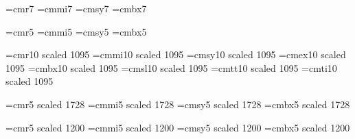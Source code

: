 {\font\sevenrm=cmr7 \font\seveni=cmmi7
\font\sevensy=cmsy7 \font\sevenbf=cmbx7

\font\fiverm=cmr5 \font\fivei=cmmi5
\font\fivesy=cmsy5 \font\fivebf=cmbx5

\def\tenpoint{\normalbaselineskip=12pt plus 0.1pt minus 0.1pt%
\abovedisplayskip 12pt plus 3pt minus 9pt%
\belowdisplayskip 12pt plus 3pt minus 9pt%
\abovedisplayshortskip 0pt plus 3pt%
\belowdisplayshortskip 7pt plus 3pt minus 4pt%
\smallskipamount=3pt plus1pt minus1pt%
\medskipamount=6pt plus2pt minus2pt%
\bigskipamount=12pt plus4pt minus4pt%
\def\rm{\fam0\tenrm}\def\it{\fam\itfam\tenit}%
\def\sl{\fam\slfam\tensl}\def\bf{\fam\bffam\tenbf}%
\def\smc{\tensmc}\def\mit{\fam 1}%
\def\cal{\fam 2}%
\textfont0=\tenrm\scriptfont0=\sevenrm\scriptscriptfont0=\fiverm%
\textfont1=\teni\scriptfont1=\seveni\scriptscriptfont1=\fivei%
\textfont2=\tensy\scriptfont2=\sevensy\scriptscriptfont2=\fivesy%
\textfont3=\tenex\scriptfont3=\tenex\scriptscriptfont3=\tenex%
\textfont\itfam=\tenit%
\textfont\slfam=\tensl%
\textfont\bffam=\tenbf\scriptfont\bffam=\sevenbf%
\scriptscriptfont\bffam=\fivebf%
\normalbaselines\rm}


\font\elevenrm=cmr10 scaled 1095    \font\eleveni=cmmi10 scaled 1095
\font\elevensy=cmsy10 scaled 1095   \font\elevenex=cmex10 scaled 1095
\font\elevenbf=cmbx10 scaled 1095   \font\elevensl=cmsl10 scaled 1095
\font\eleventt=cmtt10 scaled 1095   \font\elevenit=cmti10 scaled 1095

\font\ninerm=cmr5 scaled 1728    \font\ninei=cmmi5 scaled 1728
\font\ninesy=cmsy5 scaled 1728   \font\ninebf=cmbx5 scaled 1728

\font\sixrm=cmr5 scaled 1200    \font\sixi=cmmi5 scaled 1200
\font\sixsy=cmsy5 scaled 1200   \font\sixbf=cmbx5 scaled 1200

\def\elevenpoint{\normalbaselineskip=12.2pt plus 0.1pt minus 0.1pt%
\abovedisplayskip 12.2pt plus 3pt minus 9pt%
\belowdisplayskip 12.2pt plus 3pt minus 9pt%
\abovedisplayshortskip 0pt plus 3pt%
\belowdisplayshortskip 7.1pt plus 3pt minus 4pt%
\smallskipamount=3.3pt plus1.2pt minus1.2pt%
\medskipamount=6.6pt plus2.2pt minus2.2pt%
\bigskipamount=13.2pt plus4.4pt minus4.4pt%
\def\rm{\fam0\elevenrm}\def\it{\fam\itfam\elevenit}%
\def\sl{\fam\slfam\elevensl}\def\bf{\fam\bffam\elevenbf}%
\def\mit{\fam 1}\def\cal{\fam 2}%
\def\tt{\eleventt}%
\textfont0=\elevenrm\scriptfont0=\ninerm\scriptscriptfont0=\sixrm%
\textfont1=\eleveni\scriptfont1=\ninei\scriptscriptfont1=\sixi%
\textfont2=\elevensy\scriptfont2=\ninesy\scriptscriptfont2=\sixsy%
\textfont3=\elevenex\scriptfont3=\elevenex%
\scriptscriptfont3=\elevenex%
\textfont\itfam=\elevenit%
\textfont\slfam=\elevensl%
\textfont\bffam=\elevenbf\scriptfont\bffam=\ninebf%
\scriptscriptfont\bffam=\sixbf%
\normalbaselines\rm}%

}
